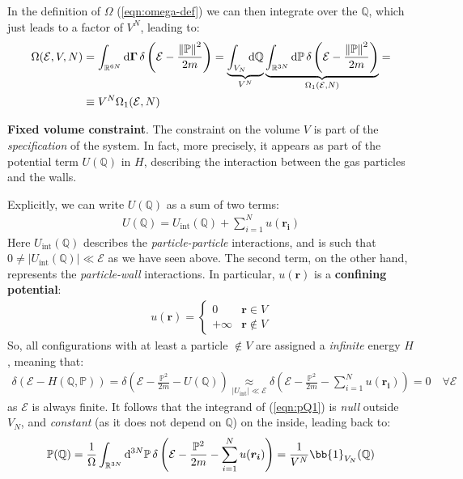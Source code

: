 \documentclass[../template.tex]{subfiles}
\begin{document}
In the definition of $\Omega$ (\ref{eqn:omega-def}) we can then integrate over the $\mathbb{Q}$, which just leads to a factor of $V^N$, leading to: 
\begin{align}\nonumber
    \Omega(\mathcal{E}, V, N) &= \int_{\mathbb{R}^{6N}} \dd{\bm{\Gamma}} \delta\left(\mathcal{E}-\frac{\norm{\mathbb{P}}^2}{2m} \right) = \underbrace{\int_{V_N} \dd{\mathbb{Q}}}_{V^N} \underbrace{\int_{\mathbb{R}^{3N}} \dd{\mathbb{P}} \delta\left(\mathcal{E}- \frac{\norm{\mathbb{P}}^2}{2m} \right) }_{\Omega_1(\mathcal{E},N)}=\\
    & \equiv V^N \Omega_1(\mathcal{E}, N) \label{eqn:omega1-def}
\end{align}

\begin{appr}\textbf{Fixed volume constraint}. The constraint on the volume $V$ is part of the \textit{specification} of the system. In fact, more precisely, it appears as part of the potential term $U(\mathbb{Q})$ in $H$, describing the interaction between the gas particles and the walls.

Explicitly, we can write $U(\mathbb{Q})$ as a sum of two terms:
\begin{align*}
    U(\mathbb{Q}) = U_{\mathrm{int}}(\mathbb{Q}) + \sum_{i=1}^N u(\bm{r_i})
\end{align*}
Here $U_{\mathrm{int}}(\mathbb{Q})$ describes the \textit{particle-particle} interactions, and is such that $0 \neq |U_{\mathrm{int}}(\mathbb{Q})| \ll \mathcal{E}$ as we have seen above. The second term, on the other hand, represents the \textit{particle-wall} interactions. In particular, $u(\bm{r})$ is a \textbf{confining potential}:   
\begin{align*}
    u(\bm{r}) = \begin{cases}
        0 & \bm{r} \in V\\
        +\infty & \bm{r}\not\in V
    \end{cases}
\end{align*}
So, all configurations with at least a particle $\notin V$ are assigned a \textit{infinite} energy $H$, meaning that: 
\begin{align*}
    \delta(\mathcal{E}- H(\mathbb{Q},\mathbb{P})) = \delta\left(\mathcal{E}-\frac{\mathbb{P}^2}{2m} - U(\mathbb{Q}) \right) \underset{|U_{\mathrm{int} }| \ll \mathcal{E}}{\approx}  \delta\left(\mathcal{E}- \frac{\mathbb{P}^2}{2m} - \sum_{i=1}^N u(\bm{r_i}) \right) = 0 \quad \forall \mathcal{E}
\end{align*}
as $\mathcal{E}$ is always finite. It follows that the integrand of (\ref{eqn:pQ1}) is \textit{null} outside $V_N$, and \textit{constant} (as it does not depend on $\mathbb{Q}$) on the inside, leading back to:
\begin{align*}
    \mathbb{P}(\mathbb{Q}) = \frac{1}{\Omega} \int_{\mathbb{R}^{3N}} \dd[3N]{\mathbb{P}} \delta\left(\mathcal{E}- \frac{\mathbb{P}^2}{2m} - \sum_{i=1}^N u(\bm{r_i}) \right) = \frac{1}{V^N} \bb{1}_{V_N} (\mathbb{Q}) 
\end{align*}
\end{appr}
\end{document}
